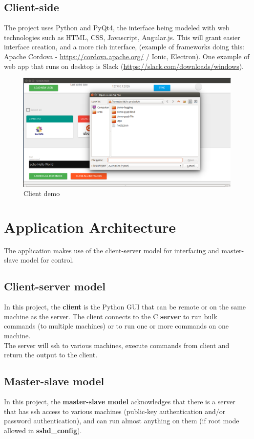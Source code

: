 \documentclass{llncs}
\begin{document}
\subsection{Client-side}

The project uses Python and PyQt4, the interface being modeled with web technologies such as HTML, CSS, Javascript, Angular.js. This will grant easier interface creation, and a more rich interface, (example of frameworks doing this: Apache Cordova - \url{https://cordova.apache.org/} / Ionic, Electron). One example of web app that runs on desktop is Slack (\url{https://slack.com/downloads/windows}).

\begin{figure}[!h]
	\label{fig:example}
	\includegraphics[scale=0.35]{client-interm.png}
	\centering
	\caption{Client demo}
\end{figure}

\FloatBarrier
%
\section{Application Architecture}
%
The application makes use of the client-server model for interfacing and master-slave model for control.

\subsection{Client-server model}
In this project, the \textbf{client} is the Python GUI that can be remote or on the same machine as the server. The client connects to the C \textbf{server} to run bulk commands (to multiple machines) or to run one or more commands on one machine.\\
The server will ssh to various machines, execute commands from client and return the output to the client.

\subsection{Master-slave model}
In this project, the \textbf{master-slave model} acknowledges that there is a server that has ssh access to various machines (public-key authentication and/or password authentication), and can run almost anything on them (if root mode allowed in \textbf{sshd\_config}).
\end{document}
